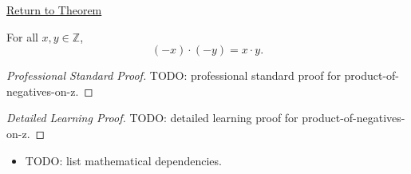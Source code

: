 \newpage
{}
\label{prf:product-of-negatives-on-z}

\begin{remark*}[Return]
\hyperref[cor:product-of-negatives-on-z]{Return to Theorem}
\end{remark*}

\begin{corollary*}
For all $x,y\in\mathbb{Z}$,
\[
(-x)\cdot(-y)=x\cdot y.
\]
\end{corollary*}

\begin{proof}[Professional Standard Proof]
\LRAProofBodyStart
TODO: professional standard proof for product-of-negatives-on-z.
\end{proof}

\begin{proof}[Detailed Learning Proof]
\LRAProofBodyStart
TODO: detailed learning proof for product-of-negatives-on-z.
\end{proof}

\begin{remark*}
\end{remark*}

\begin{dependencies}
\begin{itemize}
  \item TODO: list mathematical dependencies.
\end{itemize}
\end{dependencies}

\clearpage
